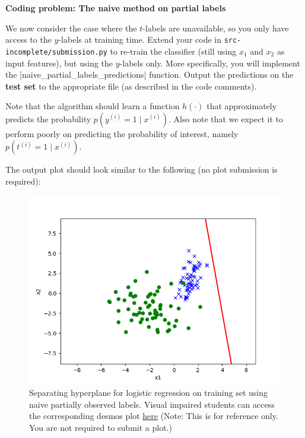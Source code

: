 \item {} \textbf{Coding problem: The naive method on partial labels}

We now consider the case where the $t$-labels are unavailable, so you only have
access to the $y$-labels at training time. Extend your code in
\texttt{src-incomplete/submission.py} to re-train the classifier (still using $x_1$ and
$x_2$ as input features), but using the $y$-labels only. More specifically, you will implement
the |naive_partial_labels_predictions| function. Output the predictions
on the \textbf{test set} to the appropriate file (as described in the code comments).

Note that the algorithm should learn a function $h(\cdot)$ that approximately predicts the probability $p(y^{(i)}=1\mid x^{(i)})$. Also note that we expect it to perform poorly on predicting the probability of interest, namely $p(t^{(i)}=1\mid x^{(i)})$.

The output plot should look similar to the following (no plot submission is required):
\begin{figure}[H]
	\centering
	\vspace{2mm}
	\includegraphics[width=0.5\linewidth]{02-posonly/posonly_naive_pred.png}
    \caption{Separating hyperplane for logistic regression on training set using naive partially observed labels. Visual impaired students can access the corresponding desmos plot \href{https://www.desmos.com/calculator/z7hz6em1by}{here} (Note: This is for reference only.  You are not required to submit a plot.)}
\end{figure}


